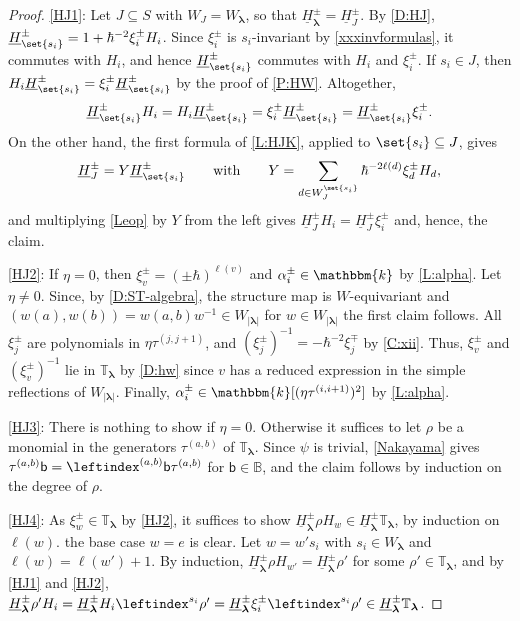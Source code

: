 \documentclass[a4paper,11pt]{amsart}
\newcommand\blam{{\boldsymbol\lambda}}
\numberwithin{equation}{subsection}
\theoremstyle{definition}
\theoremstyle{theorem}
\theoremstyle{remark}
\newcommand\HJpm{\underline{H}^\pm}
\newcommand\Sym{W}
\newcommand\xipm{\xi^\pm}
\newcommand\bb{\mathsf{b}}
\newcommand\taui[1][i]{\tau^{(#1)}}
\newcommand\kk{\mathbbm{k}}
\newcommand\Tos{\mathbb{T}}
\newcommand{\Bo}{\mathbb{B}}
\begin{document}
\begin{proof}
  \autoref{HJ1}: Let $J\subseteq S$ with $\Sym_J=\Sym_\blam$, so that $\HJpm_\blam=\HJpm_J$. By
  \autoref{D:HJ}, $\HJpm_{\set{s_i}}=1+\hbar^{-2}\xipm_iH_i$. Since $\xipm_i$ is $s_i$-invariant by
  \autoref{xxxinvformulas}, it commutes with $H_i$, and hence $\HJpm_{\set{s_i}}$ commutes with
  $H_i$ and $\xipm_i$. If $s_i\in J$, then $H_i\HJpm_{\set{s_i}}=\xipm_i\HJpm_{\set{s_i}}$ by the
  proof of \autoref{P:HW}. Altogether,
  \begin{equation}\label{Leop}
    \HJpm_{\set{s_i}}H_i=H_i\HJpm_{\set{s_i}}=\xipm_i\HJpm_{\set{s_i}}=\HJpm_{\set{s_i}}\xipm_i.
  \end{equation}
  On the other hand, the first formula of \autoref{L:HJK}, applied to $\set{s_i}\subseteq J$, gives
  \[
    \HJpm_J=Y\HJpm_{\set{s_i}}\qquad\text{with}\qquad
    Y=\sum_{d\in\Sym^{\set{s_i}}_J}\hbar^{-2\ell(d)}\xipm_dH_d,
  \]
  and multiplying \autoref{Leop} by $Y$ from the left gives $
  \HJpm_JH_i= \HJpm_J\xipm_i$ and, hence, the claim.

  \autoref{HJ2}: If $\eta=0$, then $\xipm_v=(\pm\hbar)^{\ell(v)}$ and $\alpha^\pm_i\in\kk$ by
  \autoref{L:alpha}. Let $\eta\ne0$. Since, by \autoref{D:ST-algebra}, the structure map is
  $\Sym$-equivariant and
  $(w(a),w(b))=w(a,b)w^{-1}\in\Sym_{|\blam|}$ for $w\in\Sym_{|\blam|}$ the first claim follows. All $\xipm_j$ are
  polynomials in $\eta\taui[j,j+1]$, and $(\xipm_j)^{-1}=-\hbar^{-2}\xi^\mp_j$ by \autoref{C:xii}.
  Thus, $\xipm_v$ and
  $(\xipm_v)^{-1}$ lie in $\Tos_\blam$ by \autoref{D:hw} since $v$ has a reduced expression in the simple reflections of $\Sym_{|\blam|}$. Finally,
  $\alpha^\pm_i\in\kk[(\eta\taui[i,i+1])^2]$ by \autoref{L:alpha}.

  \autoref{HJ3}: There is nothing to show if $\eta=0$. Otherwise it suffices to let $\rho$ be a
  monomial in the generators $\taui[a,b]$ of $\Tos_\blam$. Since $\psi$ is trivial,
  \autoref{Nakayama} gives $\taui[a,b]\bb=\leftindex^{(a,b)}{\bb}\taui[a,b]$ for $\bb\in\Bo$, and the
  claim follows by induction on the degree of $\rho$.

  \autoref{HJ4}: As $\xipm_w\in\Tos_\blam$ by \autoref{HJ2}, it suffices to show
  $\HJpm_\blam \rho H_w\in\HJpm_\blam\Tos_\blam$, by induction on $\ell(w)$. the base case $w=e$ is clear.  Let $w=w's_i$ with
  $s_i\in\Sym_\blam$ and $\ell(w)=\ell(w')+1$. By induction, $\HJpm_\blam \rho H_{w'}=\HJpm_\blam \rho'$
  for some $\rho'\in\Tos_\blam$, and by \autoref{HJ1} and \autoref{HJ2},
  $\HJpm_\blam \rho'H_i=\HJpm_\blam H_i\leftindex^{s_i}{{\rho'}}=\HJpm_\blam\xipm_i\leftindex^{s_i}{{\rho'}}
  \in\HJpm_\blam\Tos_\blam$.


\end{proof}
\end{document}
